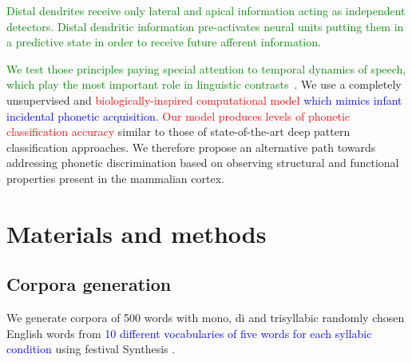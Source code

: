\documentclass[10pt,letterpaper]{article}
\begin{document}
\textcolor{green}{Distal dendrites receive only lateral and apical information acting as independent detectors. Distal dendritic information pre-activates neural units putting them in a predictive state in order to receive future afferent information}.

\textcolor{green}{We test those principles paying special attention to temporal dynamics of speech, which play the most important role in linguistic contrasts~\cite{doi:10.1098/rstb.1992.0070}}. We use a completely unsupervised and \textcolor{red}{biologically-inspired computational model} \textcolor{blue}{which mimics infant incidental phonetic acquisition}. \textcolor{red}{Our model produces levels of phonetic classification accuracy} similar to those of state-of-the-art deep pattern classification approaches. We therefore propose an alternative path towards addressing phonetic discrimination based on observing structural and functional properties present in the mammalian cortex.


















\section*{Materials and methods}


\subsection*{Corpora generation}
\label{CorpGen}

We generate corpora of 500 words with mono, di and trisyllabic randomly chosen English words from \textcolor{blue}{10 different vocabularies of five words
for each syllabic condition} using \gls{festival} Synthesis \cite{festival2014}.

\end{document}
